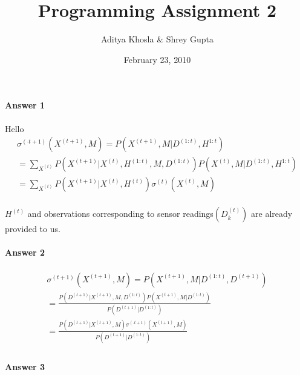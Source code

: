 \documentclass[12pt]{article}
\title{Programming Assignment 2}
\author{Aditya Khosla \& Shrey Gupta}
\date{February 23, 2010}
\begin{document}
\maketitle

\paragraph{Answer 1} 
Hello
\[
\begin{array}{l}
 {\sigma ^{( \cdot t + 1)}}({X^{(t + 1)}},M) = P({X^{(t + 1)}},M|{D^{(1:t)}}, {H^{1:t}}) \\ 
  = \sum\limits_{{X^{(t)}}} {P({X^{(t + 1)}}|{X^{(t)}},{H^{(1:t)}},M,{D^{(1:t)}})} P({X^{(t)}},M|{D^{(1:t)}}, {H^{1:t}}) \\ 
  = \sum\limits_{{X^{(t)}}} {P({X^{(t + 1)}}|{X^{(t)}},{H^{(t)}}){\sigma ^{(t)}}({X^{(t)}},M)}  \\ 
 \end{array}
 
 \]
 
 ${H^{(t)}}$ and observations corresponding to sensor readings$(D_k^{(t)})$ are already provided to us. \\
\paragraph{Answer 2} 

\[\begin{array}{l}
 {\sigma ^{(t + 1)}}({X^{(t + 1)}},M) = P({X^{(t + 1)}},M|{D^{(1:t)}},{D^{(t + 1)}}) \\ 
  = \frac{{P({D^{(t + 1)}}|{X^{(t + 1)}},M,{D^{(1:t)}})P({X^{(t + 1)}},M|{D^{(1:t)}})}}{{P({D^{(t + 1)}}|{D^{(1:t)}})}} \\ 
  = \frac{{P({D^{(t + 1)}}|{X^{(t + 1)}},M){\sigma ^{( \cdot t + 1)}}({X^{(t + 1)}},M)}}{{P({D^{(t + 1)}}|{D^{(1:t)}})}} \\ 
 \end{array}\]

\paragraph{Answer 3}
\end{document}
